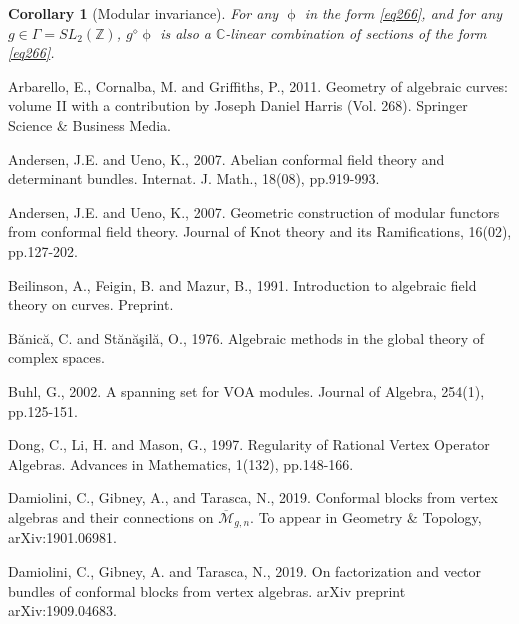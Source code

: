 \documentclass[12pt,a4paper,notitlepage]{report}
\theoremstyle{definition}
\theoremstyle{plain}
\newtheorem{co}[df]{Corollary}
\newcommand{\mc}{\mathcal}
\newcommand{\ovl}{\overline}
\newcommand{\Cbb}{\mathbb C}
\newcommand{\Zbb}{\mathbb Z}
\numberwithin{equation}{section}
\begin{document}
\begin{co}[Modular invariance]
For any $\upphi$ in the form \eqref{eq266}, and for any $g\in\Gamma=SL_2(\Zbb)$, $g^\diamond\upphi$ is also a $\Cbb$-linear combination of sections of the form \eqref{eq266}.
\end{co}


\printindex

\newpage

\begin{thebibliography}{999999}
\footnotesize	





Arbarello, E., Cornalba, M. and Griffiths, P., 2011. Geometry of algebraic curves: volume II with a contribution by Joseph Daniel Harris (Vol. 268). Springer Science \& Business Media.

Andersen, J.E. and Ueno, K., 2007. Abelian conformal field theory and determinant bundles. Internat. J.  Math., 18(08), pp.919-993.

Andersen, J.E. and Ueno, K., 2007. Geometric construction of modular functors from conformal field theory. Journal of Knot theory and its Ramifications, 16(02), pp.127-202.

Beilinson, A., Feigin, B. and Mazur, B., 1991. Introduction to algebraic field theory on curves. Preprint.

Bănică, C. and Stănăşilă, O., 1976. Algebraic methods in the global theory of complex spaces.

Buhl, G., 2002. A spanning set for VOA modules. Journal of Algebra, 254(1), pp.125-151.

Dong, C., Li, H. and Mason, G., 1997. Regularity of Rational Vertex Operator Algebras. Advances in Mathematics, 1(132), pp.148-166.

Damiolini, C., Gibney, A., and Tarasca, N., 2019. Conformal blocks from vertex algebras and their connections on $\ovl{\mc M}_{g,n}$.  To appear in Geometry \& Topology, arXiv:1901.06981.

Damiolini, C., Gibney, A. and Tarasca, N., 2019. On factorization and vector bundles of conformal blocks from vertex algebras. arXiv preprint arXiv:1909.04683.


\end{thebibliography}
\end{document}
